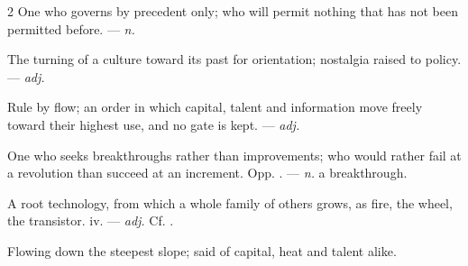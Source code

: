 \begin{multicols}{2}
 One who governs by precedent only; who will permit nothing that has not been permitted before. —  \textit{n.}

 The turning of a culture toward its past for orientation; nostalgia raised to policy. —  \textit{adj.}

 Rule by flow; an order in which capital, talent and information move freely toward their highest use, and no gate is kept. —  \textit{adj.}

 One who seeks breakthroughs rather than improvements; who would rather fail at a revolution than succeed at an increment. Opp. . —  \textit{n.} a breakthrough.

 A root technology, from which a whole family of others grows, as fire, the wheel, the transistor.   iv. —  \textit{adj.} Cf. .

 Flowing down the steepest slope; said of capital, heat and talent alike.

\end{multicols}


